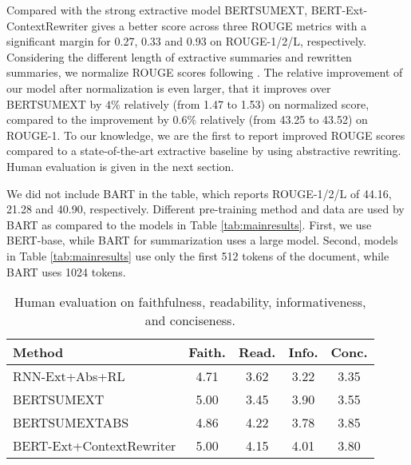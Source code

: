 \documentclass[letterpaper]{article} %
\begin{document}
Compared with the strong extractive model BERTSUMEXT, BERT-Ext-ContextRewriter gives a better score across three ROUGE metrics with a significant margin for 0.27, 0.33 and 0.93 on ROUGE-1/2/L, respectively. 
Considering the different length of extractive summaries and rewritten summaries, we normalize ROUGE scores following \citet{sun-etal-2019-compare}. The relative improvement of our model after normalization is even larger, that it improves over BERTSUMEXT by $4\%$ relatively (from 1.47 to 1.53) on normalized score, compared to the improvement by $0.6\%$ relatively (from 43.25 to 43.52) on ROUGE-1.
To our knowledge, we are the first to report improved ROUGE scores compared to a state-of-the-art extractive baseline by using abstractive rewriting. Human evaluation is given in the next section.

We did not include BART \cite{Lewis2019} in the table, which reports ROUGE-1/2/L of 44.16, 21.28 and 40.90, respectively. Different pre-training method and data are used by BART as compared to the models in Table \ref{tab:mainresults}. First, we use BERT-base, while BART for summarization uses a large model. Second, models in Table \ref{tab:mainresults} use only the first 512 tokens of the document, while BART uses 1024 tokens.


\begin{table}[t]
    \centering\small
    \begin{tabular}{@{}lcccc@{}}
        \hline
        \bf{Method} & \bf{Faith.} & \bf{Read.} & \bf{Info.} & \bf{Conc.}  \\
        \hline
        RNN-Ext+Abs+RL & 4.71 & 3.62 & 3.22 & 3.35  \\
        BERTSUMEXT & 5.00 & 3.45 & 3.90 & 3.55  \\
        BERTSUMEXTABS & 4.86 & 4.22 & 3.78 & 3.85  \\
        \hline
        BERT-Ext+ContextRewriter & 5.00 & 4.15 & 4.01 & 3.80  \\
        \hline
    \end{tabular}
    \caption{Human evaluation on faithfulness, readability, informativeness, and conciseness.}
    \label{tab:humaneval}
\end{table}
\end{document}

